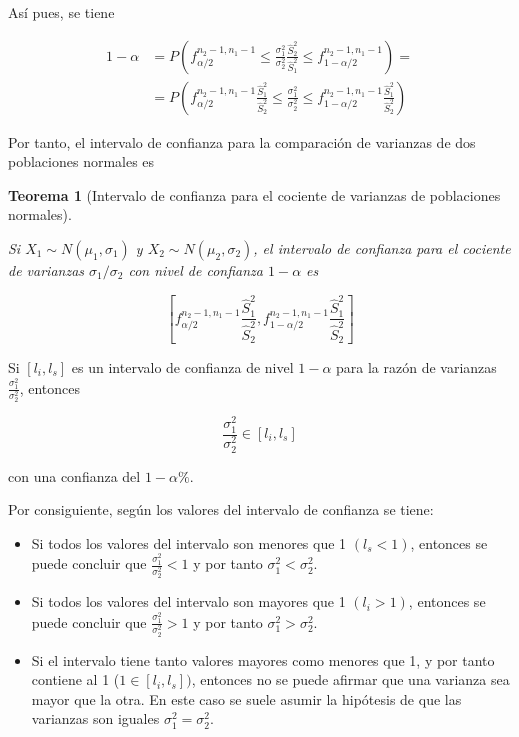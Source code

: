 \documentclass[
  a4paper,
]{scrreport}
\providecommand{\tightlist}{%
  \setlength{\itemsep}{0pt}\setlength{\parskip}{0pt}}\usepackage{longtable,booktabs,array}
\theoremstyle{definition}
\theoremstyle{definition}
\theoremstyle{plain}
\newtheorem{theorem}{Teorema}[chapter]
\theoremstyle{remark}
\begin{document}
Así pues, se tiene

\begin{align*}
1-\alpha &= P\left(f^{n_2-1,n_1-1}_{\alpha/2}\leq \frac{\sigma_1^2}{\sigma_2^2}\frac{\hat{S}_2^2}{\hat{S}_1^2}  \leq
f^{n_2-1,n_1-1}_{1-\alpha/2}\right) = \\ &= P\left(f^{n_2-1,n_1-1}_{\alpha/2}\frac{\hat{S}_1^2}{\hat{S}_2^2} \leq
\frac{\sigma_1^2}{\sigma_2^2}  \leq f^{n_2-1,n_1-1}_{1-\alpha/2}\frac{\hat{S}_1^2}{\hat{S}_2^2}\right)
\end{align*}

Por tanto, el intervalo de confianza para la comparación de varianzas de
dos poblaciones normales es

\begin{theorem}[Intervalo de confianza para el cociente de varianzas de
poblaciones
normales]\protect\hypertarget{thm-intervalo-confianza-cociente-varianzas-normales-varianzas}{}\label{thm-intervalo-confianza-cociente-varianzas-normales-varianzas}

Si \(X_1\sim N(\mu_1,\sigma_1)\) y \(X_2\sim N(\mu_2,\sigma_2)\), el
\emph{intervalo de confianza para el cociente de varianzas}
\(\sigma_1/\sigma_2\) con nivel de confianza \(1-\alpha\) es

\[
\left[f^{n_2-1,n_1-1}_{\alpha/2}\frac{\hat{S}_1^2}{\hat{S}_2^2},f^{n_2-1,n_1-1}_{1-\alpha/2}\frac{\hat{S}_1^2}{\hat{S}_2^2}\right]
\]

\end{theorem}

Si \([l_i,l_s]\) es un intervalo de confianza de nivel \(1-\alpha\) para
la razón de varianzas \(\frac{\sigma_1^2}{\sigma_2^2}\), entonces

\[
\frac{\sigma_1^2}{\sigma_2^2} \in [l_i,l_s]
\]

con una confianza del \(1-\alpha\%\).

Por consiguiente, según los valores del intervalo de confianza se tiene:

\begin{itemize}
\tightlist
\item
  Si todos los valores del intervalo son menores que 1 \((l_s<1)\),
  entonces se puede concluir que \(\frac{\sigma_1^2}{\sigma_2^2}<1\) y
  por tanto \(\sigma_1^2<\sigma_2^2\).
\item
  Si todos los valores del intervalo son mayores que 1 \((l_i>1)\),
  entonces se puede concluir que \(\frac{\sigma_1^2}{\sigma_2^2}>1\) y
  por tanto \(\sigma_1^2>\sigma_2^2\).
\item
  Si el intervalo tiene tanto valores mayores como menores que 1, y por
  tanto contiene al 1 (\(1\in [l_i,l_s])\), entonces no se puede afirmar
  que una varianza sea mayor que la otra. En este caso se suele asumir
  la hipótesis de que las varianzas son iguales
  \(\sigma_1^2=\sigma_2^2\).
\end{itemize}
\end{document}
